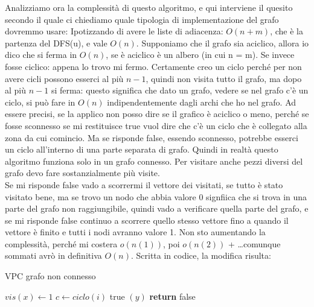 Analizziamo ora la complessità di questo algoritmo, e qui interviene il quesito secondo il quale ci chiediamo quale tipologia di implementazione del grafo dovremmo usare:
Ipotizzando di avere le liste di adiacenza: $O(n+m)$, che è la partenza del DFS(u), e vale $O(n)$. Supponiamo che il grafo sia aciclico, allora io dico che si ferma in $O(n)$, se è aciclico è un albero (in cui n = m). Se invece fosse ciclico: appena lo trovo mi fermo. Certamente creo un ciclo perché per non avere cicli possono esserci al più $n-1$, quindi non visita tutto il grafo, ma dopo al più $n-1$ si ferma: questo significa che dato un grafo, vedere se nel grafo c'è un ciclo, si può fare in $O(n)$ indipendentemente dagli archi che ho nel grafo. Ad essere precisi, se la applico non posso dire se il grafico è aciclico o meno, perché se fosse sconnesso se mi restituisce true vuol dire che c'è un ciclo che è collegato alla zona da cui comincio. Ma se risponde false, essendo sconnesso, potrebbe esserci un ciclo all'interno di una parte separata di grafo. Quindi in realtà questo algoritmo funziona solo in un grafo connesso. Per visitare anche pezzi diversi del grafo devo fare sostanzialmente più visite. \\

Se mi risponde false vado a scorrermi il vettore dei visitati, se tutto è stato visitato bene, ma se trovo un nodo che abbia valore 0 signfiica che si trova in una parte del grafo non raggiungibile, quindi vado a verificare quella parte del grafo, e se mi risponde false continuo a scorrere quello stesso vettore fino a quando il vettore è finito e tutti i nodi avranno valore 1. Non sto aumentando la complessità, perché mi costera $o(n(1))$, poi $o(n(2))$ + \ldots comunque sommati avrò in definitiva $O(n)$. Scritta in codice, la modifica risulta:

\begin{algorithm}
    \caption{VPC grafo non connesso}\label{alg:VPCnC}
    \begin{algorithmic}[1]
            \State ${vis}(x) \gets 1$ 
             \Comment{}
                 $c \gets {ciclo}(i) $
                \EndIf
                    \Return true $(y)$ \Comment{}
                \EndIf
            \EndFor
            \State \textbf{return} false\Comment{}
        \EndFunction
    \end{algorithmic}
\end{algorithm}

